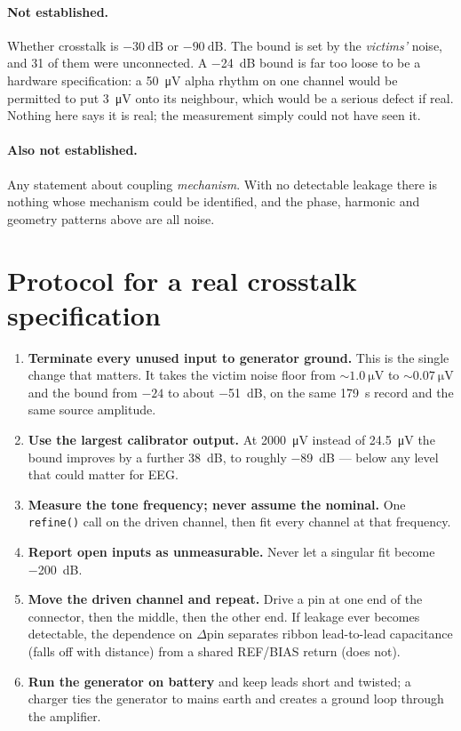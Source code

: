 \documentclass[11pt,a4paper]{article}
\begin{document}
\paragraph{Not established.} Whether crosstalk is $-\SI{30}{\deci\bel}$ or
$-\SI{90}{\deci\bel}$. The bound is set by the \emph{victims'} noise, and 31 of them were
unconnected. A \SI{-24}{\deci\bel} bound is far too loose to be a hardware specification: a
\SI{50}{\micro\volt} alpha rhythm on one channel would be permitted to put \SI{3}{\micro\volt}
onto its neighbour, which would be a serious defect if real. Nothing here says it is real; the
measurement simply could not have seen it.

\paragraph{Also not established.} Any statement about coupling \emph{mechanism}. With no
detectable leakage there is nothing whose mechanism could be identified, and the phase,
harmonic and geometry patterns above are all noise.

\section{Protocol for a real crosstalk specification}
\label{sec:protocol}

\begin{enumerate}
\item \textbf{Terminate every unused input to generator ground.} This is the single change that
matters. It takes the victim noise floor from ${\sim}\SI{1.0}{\micro\volt}$ to
${\sim}\SI{0.07}{\micro\volt}$ and the bound from $-24$ to about \SI{-51}{\deci\bel}, on the
same \SI{179}{\second} record and the same source amplitude.

\item \textbf{Use the largest calibrator output.} At \SI{2000}{\micro\volt} instead of
\SI{24.5}{\micro\volt} the bound improves by a further \SI{38}{\deci\bel}, to roughly
\SI{-89}{\deci\bel} --- below any level that could matter for EEG.

\item \textbf{Measure the tone frequency; never assume the nominal.} One
\texttt{refine()} call on the driven channel, then fit every channel at that frequency.

\item \textbf{Report open inputs as unmeasurable.} Never let a singular fit become
\SI{-200}{\deci\bel}.

\item \textbf{Move the driven channel and repeat.} Drive a pin at one end of the connector, then
the middle, then the other end. If leakage ever becomes detectable, the dependence on
$\Delta\text{pin}$ separates ribbon lead-to-lead capacitance (falls off with distance) from a
shared REF/BIAS return (does not).

\item \textbf{Run the generator on battery} and keep leads short and twisted; a charger ties the
generator to mains earth and creates a ground loop through the amplifier.
\end{enumerate}
\end{document}
